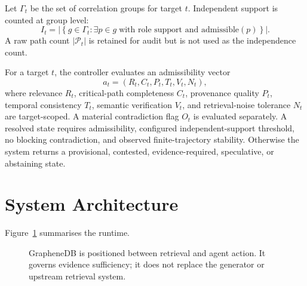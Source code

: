 \documentclass[10pt]{article}
\newcommand{\paths}{\mathcal{P}}
\begin{document}
Let $\Gamma_t$ be the set of correlation groups for target $t$. Independent support is counted at group level:
\[
I_t = \left|\left\{g\in\Gamma_t:\exists p\in g\;\text{with role support and admissible}(p)\right\}\right|.
\]
A raw path count $|\paths_t|$ is retained for audit but is not used as the independence count.

For a target $t$, the controller evaluates an admissibility vector
\[
a_t=(R_t,C_t,P_t,T_t,V_t,N_t),
\]
where relevance $R_t$, critical-path completeness $C_t$, provenance quality $P_t$, temporal consistency $T_t$, semantic verification $V_t$, and retrieval-noise tolerance $N_t$ are target-scoped. A material contradiction flag $O_t$ is evaluated separately. A resolved state requires admissibility, configured independent-support threshold, no blocking contradiction, and observed finite-trajectory stability. Otherwise the system returns a provisional, contested, evidence-required, speculative, or abstaining state.

\section{System Architecture}
Figure~\ref{fig:architecture} summarises the runtime.

\begin{figure}[t]
\centering
{}
\caption{GrapheneDB is positioned between retrieval and agent action. It governs evidence sufficiency; it does not replace the generator or upstream retrieval system.}
\label{fig:architecture}
\end{figure}
\end{document}
